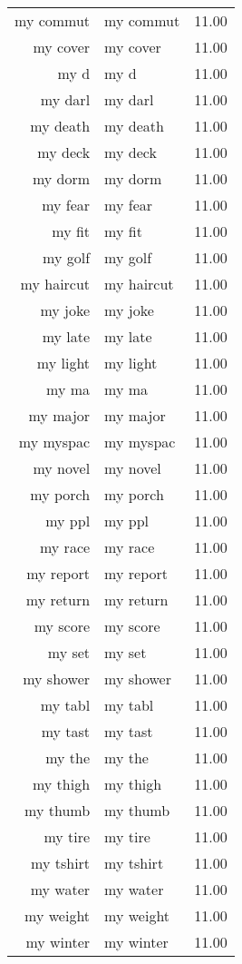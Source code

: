\begin{table}[ht]
\begin{tabular}{rlr}
  my commut & my commut & 11.00 \\ 
  my cover & my cover & 11.00 \\ 
  my d & my d & 11.00 \\ 
  my darl & my darl & 11.00 \\ 
  my death & my death & 11.00 \\ 
  my deck & my deck & 11.00 \\ 
  my dorm & my dorm & 11.00 \\ 
  my fear & my fear & 11.00 \\ 
  my fit & my fit & 11.00 \\ 
  my golf & my golf & 11.00 \\ 
  my haircut & my haircut & 11.00 \\ 
  my joke & my joke & 11.00 \\ 
  my late & my late & 11.00 \\ 
  my light & my light & 11.00 \\ 
  my ma & my ma & 11.00 \\ 
  my major & my major & 11.00 \\ 
  my myspac & my myspac & 11.00 \\ 
  my novel & my novel & 11.00 \\ 
  my porch & my porch & 11.00 \\ 
  my ppl & my ppl & 11.00 \\ 
  my race & my race & 11.00 \\ 
  my report & my report & 11.00 \\ 
  my return & my return & 11.00 \\ 
  my score & my score & 11.00 \\ 
  my set & my set & 11.00 \\ 
  my shower & my shower & 11.00 \\ 
  my tabl & my tabl & 11.00 \\ 
  my tast & my tast & 11.00 \\ 
  my the & my the & 11.00 \\ 
  my thigh & my thigh & 11.00 \\ 
  my thumb & my thumb & 11.00 \\ 
  my tire & my tire & 11.00 \\ 
  my tshirt & my tshirt & 11.00 \\ 
  my water & my water & 11.00 \\ 
  my weight & my weight & 11.00 \\ 
  my winter & my winter & 11.00 \\ 

\end{tabular}
\end{table}
